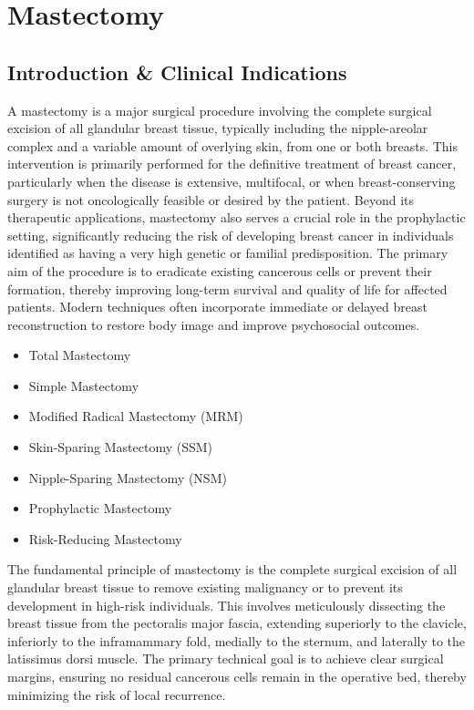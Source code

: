 \chapter{Mastectomy}

\section*{Introduction \& Clinical Indications}
A mastectomy is a major surgical procedure involving the complete surgical excision of all glandular breast tissue, typically including the nipple-areolar complex and a variable amount of overlying skin, from one or both breasts. This intervention is primarily performed for the definitive treatment of breast cancer, particularly when the disease is extensive, multifocal, or when breast-conserving surgery is not oncologically feasible or desired by the patient. Beyond its therapeutic applications, mastectomy also serves a crucial role in the prophylactic setting, significantly reducing the risk of developing breast cancer in individuals identified as having a very high genetic or familial predisposition. The primary aim of the procedure is to eradicate existing cancerous cells or prevent their formation, thereby improving long-term survival and quality of life for affected patients. Modern techniques often incorporate immediate or delayed breast reconstruction to restore body image and improve psychosocial outcomes.

\begin{itemize}
  \item Total Mastectomy
  \item Simple Mastectomy
  \item Modified Radical Mastectomy (MRM)
  \item Skin-Sparing Mastectomy (SSM)
  \item Nipple-Sparing Mastectomy (NSM)
  \item Prophylactic Mastectomy
  \item Risk-Reducing Mastectomy
\end{itemize}

The fundamental principle of mastectomy is the complete surgical excision of all glandular breast tissue to remove existing malignancy or to prevent its development in high-risk individuals. This involves meticulously dissecting the breast tissue from the pectoralis major fascia, extending superiorly to the clavicle, inferiorly to the inframammary fold, medially to the sternum, and laterally to the latissimus dorsi muscle. The primary technical goal is to achieve clear surgical margins, ensuring no residual cancerous cells remain in the operative bed, thereby minimizing the risk of local recurrence.

